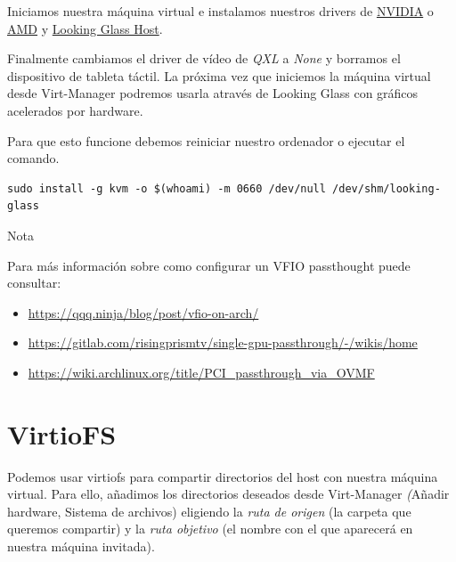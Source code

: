 \documentclass[11pt]{article}
\begin{document}
Iniciamos nuestra máquina virtual e instalamos nuestros drivers de \href{https://www.nvidia.es/Download/index.aspx?lang=es}{NVIDIA} o \href{https://www.amd.com/es/support}{AMD} y \href{https://looking-glass.io/downloads}{Looking Glass Host}.

\vspace{5pt}

Finalmente cambiamos el driver de vídeo de \emph{QXL} a \emph{None} y borramos el dispositivo de tableta táctil. La próxima vez que iniciemos la máquina virtual desde Virt-Manager podremos usarla através de Looking Glass con gráficos acelerados por hardware.

\noindent Para que esto funcione debemos reiniciar nuestro ordenador o ejecutar el comando.

\begin{verbatim}
sudo install -g kvm -o $(whoami) -m 0660 /dev/null /dev/shm/looking-glass
\end{verbatim}

\begin{mybox}{Nota}

	Para más información sobre como configurar un VFIO passthought puede consultar:

	\vspace{-7.5pt}

	\begin{itemize}
		\setlength\itemsep{-0.3em}
		\item \href{https://qqq.ninja/blog/post/vfio-on-arch/}
		      {https://qqq.ninja/blog/post/vfio-on-arch/}
		\item \href{https://gitlab.com/risingprismtv/single-gpu-passthrough/-/wikis/home}
		      {https://gitlab.com/risingprismtv/single-gpu-passthrough/-/wikis/home}
		\item \href{https://wiki.archlinux.org/title/PCI\_passthrough\_via\_OVMF}
		      {https://wiki.archlinux.org/title/PCI\_passthrough\_via\_OVMF}
	\end{itemize}
\end{mybox}

\section{VirtioFS}

Podemos usar virtiofs para compartir directorios del host con nuestra máquina virtual. Para ello, añadimos los directorios deseados desde Virt-Manager \emph(Añadir hardware, Sistema de archivos) eligiendo la \emph{ruta de origen} (la carpeta que queremos compartir) y la \emph{ruta objetivo} (el nombre con el que aparecerá en nuestra máquina invitada).
\end{document}
